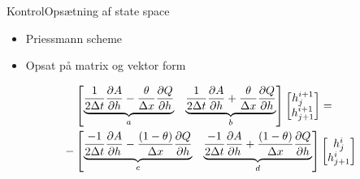 \begin{frame}{Kontrol}{Opsætning af state space}
 \vfill\vfill\centering    
\begin{itemize}
	\item Priessmann scheme \vspace{5mm}
	\item Opsat på matrix og vektor form \vspace{5mm}

\end{itemize}
\begin{equation*}\label{eq:rearrange_continuity_eq}
\begin{aligned}
	&\begin{bmatrix}
		\underbrace{\frac{1}{2\Delta t}\frac{\partial A}{\partial h}-\frac{\theta}{\Delta x}\frac{\partial Q}{\partial h}}_{a} & \underbrace{\frac{1}{2\Delta t}\frac{\partial A}{\partial h}+\frac{\theta}{\Delta x}\frac{\partial Q}{\partial h}}_{b} 
	\end{bmatrix}
	\begin{bmatrix}
		h_{j}^{i+1} \\
		h_{j+1}^{i+1}
	\end{bmatrix}
	= \\ \vspace{5mm} -
	&\begin{bmatrix}
		\underbrace{\frac{-1}{2\Delta t}\frac{\partial A}{\partial h}-\frac{(1-\theta)}{\Delta x}\frac{\partial Q}{\partial h}}_{c} & \underbrace{\frac{-1}{2\Delta t}\frac{\partial A}{\partial h}+\frac{(1-\theta)}{\Delta x}\frac{\partial Q}{\partial h}}_{d} 
	\end{bmatrix}
	\begin{bmatrix}
		h_{j}^{i} \\
		h_{j+1}^{i}
	\end{bmatrix}
	\end{aligned}
\end{equation*}
\vfill\vfill
\end{frame}




